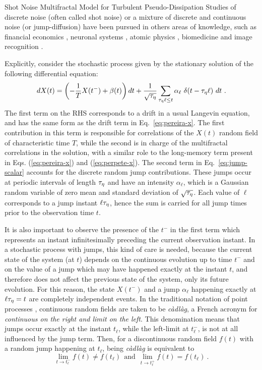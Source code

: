 \begin{chapter}{Shot Noise Multifractal Model for Turbulent Pseudo-Dissipation}
Studies of discrete noise (often called shot noise) or a mixture of discrete and continuous noise (or jump-diffusion) have been pursued in others areas of knowledge, such as financial economics \parencite{duffie2000,das2002}, neuronal systems \parencite{patel2008,sacerdote2013}, atomic physics \parencite{funke1993,montalenti1999}, biomedicine \parencite{grenander1994} and image recognition \parencite{srivastava2002}.

Explicitly, consider the stochastic process given by the stationary solution of the following differential equation:
\begin{equation} \label{eq:jump-scalar}
    dX(t) = \left( -\frac{1}{T} X(t^-) + \beta(t) \right) dt + \frac{1}{\sqrt{\teta}} \sum_{\teta \ell \leq t} \alpha_{\ell} \ \delta(t-\teta \ell) \ dt \ .
\end{equation}
The first term on the RHS corresponds to a drift in a usual Langevin equation, and has the same form as the drift term in Eq.~\eqref{eq:pereira-x}. The first contribution in this term is responsible for correlations of the $X(t)$ random field of characteristic time $T$, while the second is in charge of the multifractal correlations in the solution, with a similar role to the long-memory term present in Eqs. (\ref{eq:pereira-x}) and (\ref{eq:perpete-x}). The second term in Eq.~\eqref{eq:jump-scalar} accounts for the discrete random jump contributions. These jumps occur at periodic intervals of length $\tau_{\eta}$ and have an intensity $\alpha_{\ell}$, which is a Gaussian random variable of zero mean and standard deviation of $\sqrt{\tau_{\eta}}$. Each value of $\ell$ corresponds to a jump instant $\ell\tau_{\eta}$, hence the sum is carried for all jump times prior to the observation time $t$.

It is also important to observe the presence of the $t^-$ in the first term which represents an instant infinitesimally preceding the current observation instant. In a stochastic process with jumps, this kind of care is needed, because the current state of the system (at $t$) depends on the continuous evolution up to time $t^-$ and on the value of a jump which may have happened exactly at the instant $t$, and therefore does not affect the previous state of the system, only its future evolution. For this reason, the state $X(t^-)$ and a jump $\alpha_{\ell}$ happening exactly at $\ell \tau_{\eta} = t$ are completely independent events.
In the traditional notation of point processes \parencite{protter2005,klebaner2012}, continuous random fields are taken to be \textit{c\`{a}dl\`{a}g}, a French acronym for \textit{continuous on the right and limit on the left}. This denomination means that jumps occur exactly at the instant $t_{\ell}$, while the left-limit at $t_{\ell}^-$, is not at all influenced by the jump term. Then, for a discontinuous random field $f(t)$ with a random jump happening at $t_{\ell}$, being \textit{c\`{a}dl\`{a}g} is equivalent to
\begin{equation}
    \lim_{t \to t_{\ell}^-} f(t) \neq f(t_{\ell}) \ \ \mbox{and} \ \
    \lim_{t \to t_{\ell}^+} f(t) = f(t_{\ell}) \ .
\end{equation}


\end{chapter}
